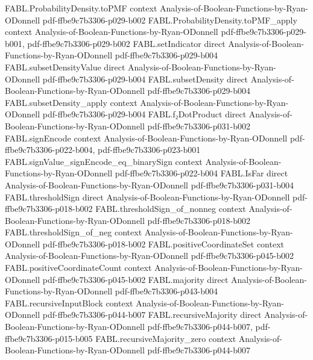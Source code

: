 \begin{theorem}
\proofstep
  {FABL.ProbabilityDensity.toPMF}
  {context}
  {Analysis-of-Boolean-Functions-by-Ryan-ODonnell}
  {pdf-ffbe9c7b3306-p029-b002}
\proofstep
  {FABL.ProbabilityDensity.toPMF_apply}
  {context}
  {Analysis-of-Boolean-Functions-by-Ryan-ODonnell}
  {pdf-ffbe9c7b3306-p029-b001,
    pdf-ffbe9c7b3306-p029-b002}
\proofstep
  {FABL.setIndicator}
  {direct}
  {Analysis-of-Boolean-Functions-by-Ryan-ODonnell}
  {pdf-ffbe9c7b3306-p029-b004}
\proofstep
  {FABL.subsetDensityValue}
  {direct}
  {Analysis-of-Boolean-Functions-by-Ryan-ODonnell}
  {pdf-ffbe9c7b3306-p029-b004}
\proofstep
  {FABL.subsetDensity}
  {direct}
  {Analysis-of-Boolean-Functions-by-Ryan-ODonnell}
  {pdf-ffbe9c7b3306-p029-b004}
\proofstep
  {FABL.subsetDensity_apply}
  {context}
  {Analysis-of-Boolean-Functions-by-Ryan-ODonnell}
  {pdf-ffbe9c7b3306-p029-b004}
\proofstep
  {FABL.f₂DotProduct}
  {direct}
  {Analysis-of-Boolean-Functions-by-Ryan-ODonnell}
  {pdf-ffbe9c7b3306-p031-b002}
\proofstep
  {FABL.signEncode}
  {context}
  {Analysis-of-Boolean-Functions-by-Ryan-ODonnell}
  {pdf-ffbe9c7b3306-p022-b004,
    pdf-ffbe9c7b3306-p023-b001}
\proofstep
  {FABL.signValue_signEncode_eq_binarySign}
  {context}
  {Analysis-of-Boolean-Functions-by-Ryan-ODonnell}
  {pdf-ffbe9c7b3306-p022-b004}
\proofstep
  {FABL.IsFar}
  {direct}
  {Analysis-of-Boolean-Functions-by-Ryan-ODonnell}
  {pdf-ffbe9c7b3306-p031-b004}
\proofstep
  {FABL.thresholdSign}
  {direct}
  {Analysis-of-Boolean-Functions-by-Ryan-ODonnell}
  {pdf-ffbe9c7b3306-p018-b002}
\proofstep
  {FABL.thresholdSign_of_nonneg}
  {context}
  {Analysis-of-Boolean-Functions-by-Ryan-ODonnell}
  {pdf-ffbe9c7b3306-p018-b002}
\proofstep
  {FABL.thresholdSign_of_neg}
  {context}
  {Analysis-of-Boolean-Functions-by-Ryan-ODonnell}
  {pdf-ffbe9c7b3306-p018-b002}
\proofstep
  {FABL.positiveCoordinateSet}
  {context}
  {Analysis-of-Boolean-Functions-by-Ryan-ODonnell}
  {pdf-ffbe9c7b3306-p045-b002}
\proofstep
  {FABL.positiveCoordinateCount}
  {context}
  {Analysis-of-Boolean-Functions-by-Ryan-ODonnell}
  {pdf-ffbe9c7b3306-p045-b002}
\proofstep
  {FABL.majority}
  {direct}
  {Analysis-of-Boolean-Functions-by-Ryan-ODonnell}
  {pdf-ffbe9c7b3306-p043-b004}
\proofstep
  {FABL.recursiveInputBlock}
  {context}
  {Analysis-of-Boolean-Functions-by-Ryan-ODonnell}
  {pdf-ffbe9c7b3306-p044-b007}
\proofstep
  {FABL.recursiveMajority}
  {direct}
  {Analysis-of-Boolean-Functions-by-Ryan-ODonnell}
  {pdf-ffbe9c7b3306-p044-b007,
    pdf-ffbe9c7b3306-p015-b005}
\proofstep
  {FABL.recursiveMajority_zero}
  {context}
  {Analysis-of-Boolean-Functions-by-Ryan-ODonnell}
  {pdf-ffbe9c7b3306-p044-b007}

\end{theorem}
